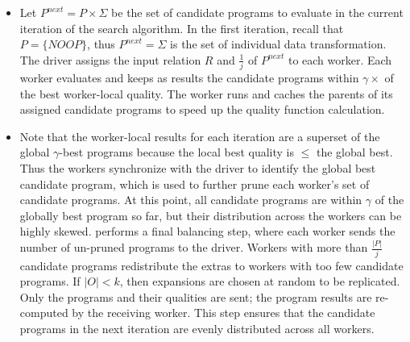 \begin{itemize}[leftmargin=*, topsep=0mm, itemsep=0mm]
\item {} 
  Let $P^{next} = P\times \Sigma$ be the set of candidate programs to evaluate in the current iteration of the search algorithm. In the first iteration, recall that $P = \{NOOP\}$, thus $P^{next} = \Sigma$ is the set of individual data transformation.   The driver assigns the input relation $R$ and $\frac{1}{j}$ of $P^{next}$ to each worker.  Each worker evaluates and keeps as results the candidate programs within $\gamma\times$ of the best worker-local quality.   The worker runs and caches the parents of its assigned candidate programs to speed up the quality function calculation.

\item  {}  Note that the worker-local results for each iteration are a superset of the global $\gamma$-best programs because the local best quality is $\le$ the global best.   Thus the workers synchronize with the driver to identify the global best candidate program, which is used to further prune each worker's set of candidate programs.  At this point, all candidate programs are within $\gamma$ of the globally best program so far, but their distribution across the workers can be highly skewed.  \sys performs a final balancing step, where each worker sends the number of un-pruned programs to the driver.  Workers with more than $\frac{|P|}{j}$ candidate programs redistribute the extras to workers with too few candidate programs.  If $|O| < k$, then expansions are chosen at random to be replicated.  Only the programs and their qualities are sent; the program results are re-computed by the receiving worker.  This step ensures that the candidate programs in the next iteration are evenly distributed across all workers.  


\end{itemize}

